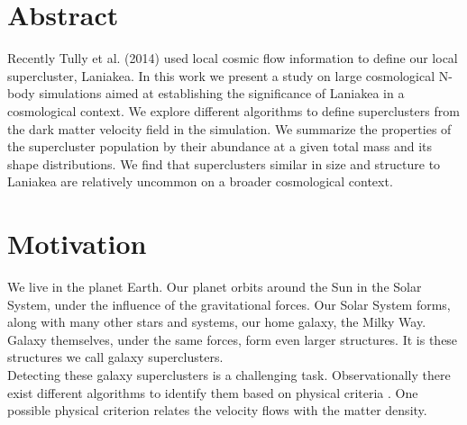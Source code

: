 \documentclass[12pt]{article}
\begin{document}
\newpage
\section{Abstract}
Recently Tully et al. (2014)
 \cite{tully_laniakea_2014} used local cosmic flow
 information to define our local supercluster,
  Laniakea. 
In this work we present a study on large
 cosmological N-body
simulations aimed at establishing the significance
 of Laniakea in a
cosmological context.
We explore different algorithms to define
 superclusters from the dark
matter velocity field in the simulation. 
We summarize the properties of the supercluster
 population by their
abundance at a given total mass and its shape
 distributions.
We find that superclusters similar in size and
 structure to Laniakea are
relatively uncommon on a broader cosmological
 context.

\newpage
\tableofcontents
\newpage

\section{Motivation}

We live in the planet Earth. Our planet orbits
 around the Sun in the Solar System, under the
  influence of the gravitational forces. Our Solar
   System forms, along with many other stars and
    systems, our home galaxy, the Milky
    Way. Galaxy themselves, under the
  same forces, form even larger structures. It is
   these structures we call galaxy superclusters. \\
   

Detecting these galaxy superclusters is a challenging
 task. Observationally there exist different algorithms to
  identify them based on
     physical criteria \cite{gott_iii_map_2005}. One
      possible physical criterion relates the velocity
       flows with the matter density.
\\
\end{document}
